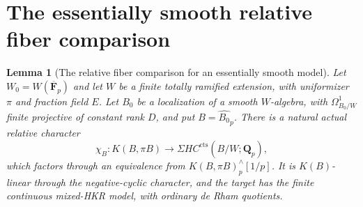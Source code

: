 \documentclass[11pt,a4paper]{article}
\newtheorem{lemma}[theorem]{Lemma}
\theoremstyle{remark}
\begin{document}
\section{The essentially smooth relative fiber comparison}
\label{sec:dimtwoAMMNAppendix}
\begin{lemma}[The relative fiber comparison for an essentially smooth model]
\label{lem:essentiallysmoothAMMN}
Let $W_0=W(\overline{\mathbf F}_p)$ and let $W$
be a finite totally ramified extension, with uniformizer $\pi$
and fraction field $E$. Let $B_0$ be a localization of a smooth
$W$-algebra, with $\Omega^1_{B_0/W}$ finite projective of constant
rank $D$, and put $B=\widehat{B_0}_p$.
There is a natural actual relative character
\[
 \chi_B:K(B,\pi B)\longrightarrow
                 \Sigma HC^{\mathrm{cts}}(B/W;\mathbf Q_p),
\]
which factors through an equivalence from
$K(B,\pi B)^{\wedge}_p[1/p]$. It is $K(B)$-linear through the negative-cyclic
character, and the target has the finite continuous mixed-HKR
model, with ordinary de Rham quotients.
\end{lemma}
\end{document}
